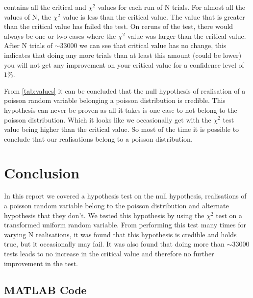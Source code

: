 \documentclass[a4paper, 12pt]{article}
\begin{document}
            \par
             contains all the critical and $\chi^2$ values for each run of N trials. For almost all the values of N, the $\chi^2$ value is less than the critical value. The value that is greater than the critical value has failed the test. On reruns of the test, there would always be one or two cases where the $\chi^2$ value was larger than the critical value. After N trials of $\sim 33000$ we can see that critical value has no change, this indicates that doing any more trials than at least this amount (could be lower) you will not get any improvement on your critical value for a confidence level of $1\%$.
            \par
            From \cref{tab:values} it can be concluded that the null hypothesis of realisation of a poisson random variable belonging a poisson distribution is credible. This hypothesis can never be proven as all it takes is one case to not belong to the poisson distribution. Which it looks like we occasionally get with the $\chi^2$ test value being higher than the critical value. So most of the time it is possible to conclude that our realisations belong to a poisson distribution.
        
    \section{Conclusion}
        In this report we covered a hypothesis test on the null hypothesis, realisations of a poisson random variable belong to the poisson distribution and alternate hypothesis that they don't. We tested this hypothesis by using the $\chi^2$ test on a transformed uniform random variable. From performing this test many times for varying N realisations, it was found that this hypothesis is credible and holds true, but it occasionally may fail. It was also found that doing more than $\sim 33000$ tests leads to no increase in the critical value and therefore no further improvement in the test.


    \begin{appendices}
        \section{MATLAB Code}
            
    \end{appendices}
\end{document}

